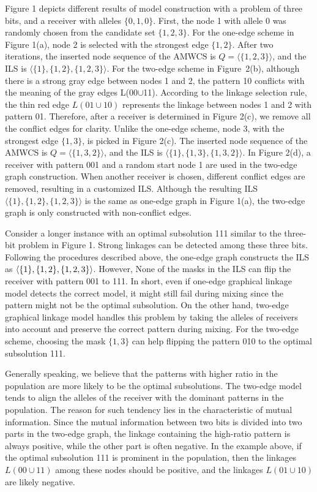Figure 1 depicts different results of model construction with  a problem of three bits, and a receiver with alleles $\{0, 1, 0\}$. First, the node 1 with allele 0 was randomly chosen from the candidate set $\{1, 2, 3\}$. For the one-edge scheme in Figure 1(a), node 2 is selected with the strongest edge $\{1, 2\}$. After two iterations, the inserted node sequence of the AMWCS  is $Q = \langle\{1, 2, 3\}\rangle$, and the ILS is  $\langle\{1\}, \{1, 2\}, \{1, 2, 3\}\rangle$. For the two-edge scheme in Figure~2(b), although there is a strong gray edge between nodes 1 and 2,  the pattern 10 conflicts with the meaning of the gray edges L(00$\cup$11). According to the linkage selection rule, the thin red edge $L(01\cup10)$ represents the linkage between nodes 1 and 2 with pattern 01. Therefore, after a receiver is determined in Figure 2(c), we remove all the conflict edges for clarity. Unlike the one-edge scheme, node 3, with the strongest edge $\{1, 3\}$, is picked in Figure 2(c). The inserted node sequence of the AMWCS is $Q = \langle\{1, 3, 2\}\rangle$,  and the ILS is $\langle\{1\}, \{1, 3\}, \{1, 3, 2\}\rangle$. In Figure 2(d), a receiver with pattern 001 and a random start node 1 are used in the two-edge graph construction. When another receiver is chosen, different conflict edges are removed, resulting in a customized ILS. Although the resulting ILS  $\langle\{1\}, \{1, 2\}, \{1, 2, 3\}\rangle$ is the same as one-edge graph in Figure 1(a), the two-edge graph is only constructed with non-conflict edges. 

Consider a longer instance with an optimal subsolution 111 similar to the three-bit problem in Figure 1. Strong linkages can be detected among these three bits. Following the procedures described above, the one-edge graph constructs the ILS as $\langle\{1\}, \{1, 2\}, \\\{1, 2, 3\}\rangle$. However, None of the masks in the ILS can flip the receiver with pattern 001 to 111. In short, even if one-edge graphical linkage model detects the correct model, it might still fail during mixing since the pattern might not be the optimal subsolution. On the other hand, two-edge graphical linkage model  handles this problem by taking the alleles of receivers into account and preserve the correct pattern during mixing. For the two-edge scheme, choosing the mask $\{1, 3\}$ can help flipping the pattern 010 to the optimal subsolution 111.   

Generally speaking, we believe that the patterns with higher ratio in the population are more likely to be the optimal subsolutions. The two-edge model tends to align the alleles of the receiver with the dominant patterns in the population. The reason for such tendency lies in the characteristic of mutual information. Since the mutual information between two bits is divided into two parts in the two-edge graph,  the  linkage containing the high-ratio pattern  is always positive, while the other part is often negative.  In the example above, if the optimal subsolution 111 is prominent in the population, then the linkages $L(00\cup11)$ among these nodes should be positive, and the linkages $L(01\cup10)$ are likely negative.  



